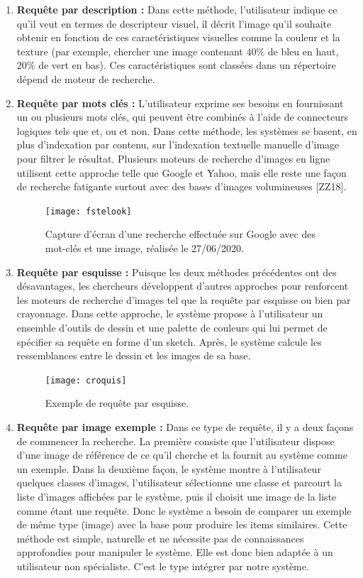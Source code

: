 \begin{enumerate}
	\item \textbf{Requête par description :}
	Dans cette méthode, l’utilisateur indique ce qu’il veut en termes de descripteur visuel, il décrit l’image qu’il souhaite obtenir en fonction de ces caractéristiques visuelles comme la couleur et la texture (par exemple, chercher une image contenant $40\%$ de bleu en haut, $20\%$ de vert en bas).
	Ces caractéristiques sont classées dans un répertoire dépend de moteur de
	recherche.
	
	\item \textbf{Requête par mots clés :}
	L’utilisateur exprime ses besoins en fournissant un ou plusieurs mots clés, qui peuvent être combinés à l'aide de connecteurs logiques tels que et, ou et non. Dans cette méthode, les systèmes se basent, en plus d'indexation par contenu, sur l’indexation textuelle manuelle d'image pour filtrer le résultat. Plusieurs moteurs de recherche d’images en ligne utilisent cette approche telle que Google et Yahoo, mais elle reste une façon de recherche fatigante surtout avec des bases d'images volumineuses [ZZ18].
	\begin{figure}[H]
		\centering
		\texttt{[image: fstelook]} 
		\caption{Capture d’écran d’une recherche effectuée sur Google avec des mot-clés et une image, réalisée le 27/06/2020.}
	\end{figure}

	\item \textbf{Requête par esquisse :} Puisque les deux méthodes précédentes ont des désavantages, les chercheurs développent d'autres approches pour renforcent les moteurs
	de recherche d’images tel que la requête par esquisse ou bien par crayonnage. Dans cette approche, le système propose à l’utilisateur un ensemble d'outils de dessin et une palette de couleurs qui lui permet de spécifier sa requête en forme d’un sketch. Après, le système calcule les ressemblances entre le dessin et les images de sa base.
		\begin{figure}[H]
			\centering
			\texttt{[image: croquis]} 
			\caption{Exemple de requête par esquisse.}
		\end{figure}
	
	\item \textbf{Requête par image exemple :}
	Dans ce type de requête, il y a deux façons de commencer la
	recherche. La première consiste que l’utilisateur dispose d’une image de référence de ce qu’il cherche et la fournit au système comme un exemple.
	Dans la deuxième façon, le système montre à l’utilisateur quelques classes d’images, l’utilisateur sélectionne une classe et parcourt la liste d’images affichées par le système, puis il choisit une image de la liste comme étant une requête.
	Donc le système a besoin de comparer un exemple de même type (image) avec la base pour produire les items similaires. Cette méthode est simple, naturelle et ne nécessite pas de connaissances approfondies pour manipuler le système. Elle est donc bien adaptée à un utilisateur non spécialiste. C'est le type intégrer par notre système.
	
\end{enumerate}


